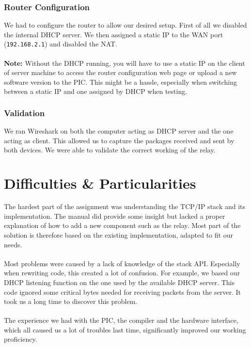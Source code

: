 \documentclass[11pt]{article}
\begin{document}
\subsubsection{Router Configuration}
We had to configure the router to allow our desired setup. First of all we
disabled the internal DHCP server. We then assigned a static IP to the WAN port
(\texttt{192.168.2.1}) and disabled the NAT.
\\\\
\textbf{Note:} Without the DHCP running, you will have to use a static IP on the
client of server machine to access the router configuration web page or upload a
new software version to the PIC. This might be a hassle, especially when
switching between a static IP and one assigned by DHCP when testing.

\subsubsection{Validation}
We ran Wireshark on both the computer acting as DHCP server and the one acting
as client. This allowed us to capture the packages received and sent by both
devices. We were able to validate the correct working of the relay.

\section{Difficulties \& Particularities}
The hardest part of the assignment was understanding the TCP/IP stack and its
implementation. The manual did provide some insight but lacked a proper
explanation of how to add a new component such as the relay. Most part of the
solution is therefore based on the existing implementation, adapted to fit our
needs.
\\\\
Most problems were caused by a lack of knowledge of the stack API. Especially
when rewriting code, this created a lot of confusion. For example, we based our
DHCP listening function on the one used by the available DHCP server. This code
ignored some critical bytes needed for receiving packets from the server. It
took us a long time to discover this problem.
\\\\
The experience we had with the PIC, the compiler and the hardware interface,
which all caused us a lot of troubles last time, significantly improved our
working proficiency.
\end{document}
